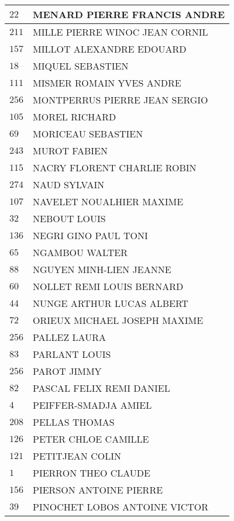\begin{xltabular}{\linewidth}{|l|X|}
    \hline
    $22$ & MENARD PIERRE FRANCIS ANDRE \\
    \hline
    $211$ & MILLE PIERRE WINOC JEAN CORNIL \\
    \hline
    $157$ & MILLOT ALEXANDRE EDOUARD \\
    \hline
    $18$ & MIQUEL SEBASTIEN \\
    \hline
    $111$ & MISMER ROMAIN YVES ANDRE \\
    \hline
    $256$ & MONTPERRUS PIERRE JEAN SERGIO \\
    \hline
    $105$ & MOREL RICHARD \\
    \hline
    $69$ & MORICEAU SEBASTIEN \\
    \hline
    $243$ & MUROT FABIEN \\
    \hline
    $115$ & NACRY FLORENT CHARLIE ROBIN \\
    \hline
    $274$ & NAUD SYLVAIN \\
    \hline
    $107$ & NAVELET NOUALHIER MAXIME \\
    \hline
    $32$ & NEBOUT LOUIS \\
    \hline
    $136$ & NEGRI GINO PAUL TONI \\
    \hline
    $65$ & NGAMBOU WALTER \\
    \hline
    $88$ & NGUYEN MINH-LIEN JEANNE \\
    \hline
    $60$ & NOLLET REMI LOUIS BERNARD \\
    \hline
    $44$ & NUNGE ARTHUR LUCAS ALBERT \\
    \hline
    $72$ & ORIEUX MICHAEL JOSEPH MAXIME \\
    \hline
    $256$ & PALLEZ LAURA \\
    \hline
    $83$ & PARLANT LOUIS \\
    \hline
    $256$ & PAROT JIMMY \\
    \hline
    $82$ & PASCAL FELIX REMI DANIEL \\
    \hline
    $4$ & PEIFFER-SMADJA AMIEL \\
    \hline
    $208$ & PELLAS THOMAS \\
    \hline
    $126$ & PETER CHLOE CAMILLE \\
    \hline
    $121$ & PETITJEAN COLIN \\
    \hline
    $1$ & PIERRON THEO CLAUDE \\
    \hline
    $156$ & PIERSON ANTOINE PIERRE \\
    \hline
    $39$ & PINOCHET LOBOS ANTOINE VICTOR \\
    \hline

\end{xltabular}
